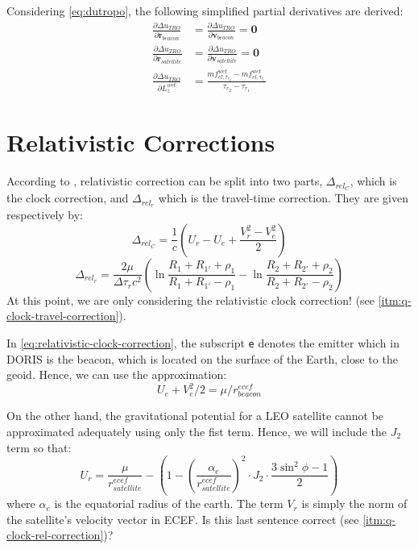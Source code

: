 Considering \ref{eq:dutropo}, the following {\color{lime} simplified} partial 
derivatives are derived:
\begin{align}
  \frac{\partial \Delta u_{TRO}}{\partial \bm{r}_{beacon}}    
    &= \frac{\partial \Delta u_{TRO}}{\partial \bm{v}_{beacon}} = \bm{0} \\
  \frac{\partial \Delta u_{TRO}}{\partial \bm{r}_{satellite}} 
    &= \frac{\partial \Delta u_{TRO}}{\partial \bm{v}_{satellite}} = \bm{0} \\
  \frac{\partial \Delta u_{TRO}}{\partial L_{z}^{wet}} 
    &= \frac{mf_{el,\tau_{r_2}}^{wet} - mf_{el,\tau_{r_1}}^{wet}}{\tau_{r_2} - \tau_{r_1}}
\end{align}

\section{Relativistic Corrections}
\label{sec:relativistic-correction}
According to \cite{lemoine-2016}, relativistic correction can be split into two 
parts, $\Delta_{rel_C}$, which is the clock correction, and $\Delta_{rel_r}$ 
which is the travel-time correction. They are given respectively by:
\begin{equation}
  \label{eq:relativistic-clock-correction}
  \Delta_{rel_C} = \frac{1}{c} \left( U_r - U_e + \frac{V_r^2 -V_e^2}{2} \right)
\end{equation}
\begin{equation}
  \Delta_{rel_r} = \frac{2\mu}{\Delta \tau _r c^2} 
    \left( \ln{\frac{R_1+R_{1'}+\rho_1}{R_1+R_{1'}-\rho_1}} 
      - \ln{\frac{R_2+R_{2'}+\rho_2}{R_2+R_{2'}-\rho_2}} \right)
\end{equation}
{\color{brown}At this point, we are only considering the relativistic clock correction!} 
(see \ref{itm:q-clock-travel-correction}).

In \ref{eq:relativistic-clock-correction}, the subscript \texttt{e} denotes the 
emitter which in DORIS is the beacon, which is located on the surface of the 
Earth, close to the geoid. Hence, we can use the approximation:
\begin{equation}
  U_e + V_e^2 / 2 = \mu / r_{beacon}^{ecef}
\end{equation}

On the other hand, the gravitational potential for a LEO satellite cannot be 
approximated adequately using only the fist term. Hence, we will include the 
$J_2$ term so that:
\begin{equation}
  U_r = \frac{\mu}{r_{satellite}^{ecef}} - 
    \left( 1 - \left( \frac{\alpha _e}{r_{satellite}^{ecef}} \right) ^2 
      \cdot J_2 \cdot \frac{3 \sin^{2}{\phi} -1}{2} \right)
\end{equation}
where $\alpha _e$ is the equatorial radius of the earth. The term $V_r$ is 
simply the norm of the satellite's {\color{brown}velocity vector in ECEF}.
Is this last sentence correct (see \ref{itm:q-clock-rel-correction})?

